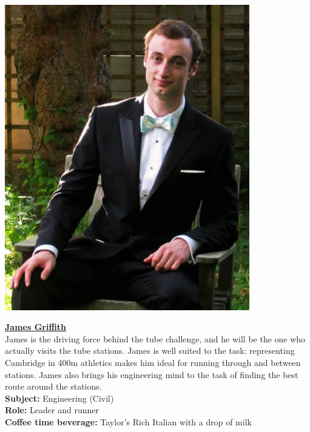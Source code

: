 \documentclass[a4paper,11pt]{article}  %
\begin{document}
\noindent \begin{minipage}{0.4\textwidth}
  \includegraphics[width=0.8\textwidth]{JamesProfile.jpg}
\end{minipage}
\hfill
\begin{minipage}{0.6\textwidth}
  {\large \textbf{\underline{James Griffith}}}\\

  James is the driving force behind the tube challenge, and he will be
  the one who actually visits the tube stations. James is well suited
  to the task: representing Cambridge in 400m athletics makes him
  ideal for running through and between stations. James also brings
  his engineering mind to the task of finding the best route around
  the stations.\\
  
  \textbf{Subject:} Engineering (Civil)\\
  \textbf{Role:} Leader and runner\\
  \textbf{Coffee time beverage:} Taylor's Rich Italian with a drop of milk
\end{minipage}

\bigskip
\end{document}

